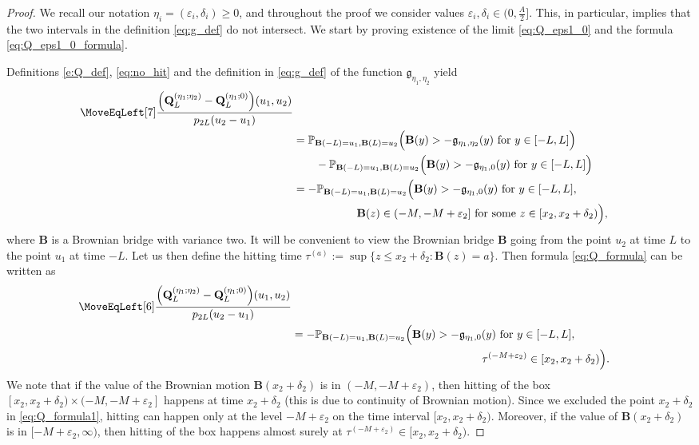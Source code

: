 \documentclass[oneside,final,11pt]{amsart}
\theoremstyle{definition}
\newcommand{\fg}{\mathfrak{g}}
\newcommand{\1}[1]{\mathbf{1}_{#1}}
\newcommand{\eps}{\varepsilon}
\newcommand{\fx}{x}
\newcommand{\fM}{M}
\newcommand{\fB}{\mathbf{B}}
\newcommand{\fQ}{\mathbf{Q}}
\renewcommand{\P}{\mathbb P}
\numberwithin{equation}{section}
\begin{document}
\begin{proof}
We recall our notation $\eta_i = (\eps_i, \delta_i) \geq 0$, and throughout the proof we consider values $\eps_i, \delta_i \in (0,\frac{A}{2}]$. This, in particular, implies that the two intervals in the definition \eqref{eq:g_def} do not intersect. We start by proving existence of the limit \eqref{eq:Q_eps1_0} and the formula \eqref{eq:Q_eps1_0_formula}.

Definitions \eqref{e:Q_def}, \eqref{eq:no_hit} and the definition in \eqref{eq:g_def} of the function $ \fg_{\eta_1, \eta_2}$ yield
\begin{equation}
\begin{split}
 \MoveEqLeft[7]
 \frac{\Bigl(\fQ_L^{(\eta_1; \eta_2)} - \fQ_L^{(\eta_1; 0)}\Bigr)(u_1, u_2)}{p_{2 L}(u_2 - u_1)}\\
 &=\P_{\fB(-L)=u_1, \fB(L)=u_2}\Bigl(\fB(y)>-\fg_{\eta_1, \eta_2}(y) \text{ for } y \in [-L,L]\Bigr) \\
 &\qquad- \P_{\fB(-L)=u_1, \fB(L)=u_2}\Bigl(\fB(y)>-\fg_{\eta_1, 0}(y) \text{ for } y \in [-L,L]\Bigr)\\
 &= - \P_{\fB(-L)=u_1, \fB(L)=u_2}\Bigl(\fB(y)>-\fg_{\eta_1, 0}(y) \text{ for } y \in [-L,L],\, \\
 & \hspace{2cm} \fB(z) \in (-\fM, -\fM + \eps_2] \text{ for some } z \in [\fx_2, \fx_2 + \delta_2)\Bigr),
 \end{split} \label{eq:Q_formula}
\end{equation}
where $\fB$ is a Brownian bridge with variance two. It will be convenient to view the Brownian bridge $\fB$ going from the point $u_2$ at time $L$ to the point $u_1$ at time $-L$. Let us then define the hitting time $\tau^{(a)} := \sup \{z \leq x_2 + \delta_2: \fB(z) = a\}$. Then formula \eqref{eq:Q_formula} can be written as
\begin{equation}
\begin{split}
\MoveEqLeft[6]
\frac{\Bigl(\fQ_L^{(\eta_1; \eta_2)} - \fQ_L^{(\eta_1; 0)}\Bigr)(u_1, u_2)}{p_{2 L}(u_2 - u_1)}\\
&= - \P_{\fB(-L)=u_1, \fB(L)=u_2}\Bigl(\fB(y)>-\fg_{\eta_1, 0}(y) \text{ for } y \in [-L,L],\, \\
& \hspace{6cm} \tau^{(-\fM + \eps_2)} \in [\fx_2, \fx_2 + \delta_2)\Bigr).
\end{split}\label{eq:Q_formula1}
\end{equation}
We note that if the value of the Brownian motion $ \fB(x_2 + \delta_2)$ is in $(-M, -M + \eps_2)$, then hitting of the box $[x_2, x_2 + \delta_2) \times (-M, -M + \eps_2]$ happens at time $x_2 + \delta_2$ (this is due to continuity of Brownian motion). Since we excluded the point $x_2 + \delta_2$ in \eqref{eq:Q_formula1}, hitting can happen only at the level $-M + \eps_2$ on the time interval $[x_2, x_2 + \delta_2)$. Moreover, if the value of $\fB(x_2 + \delta_2)$ is in $[-M + \eps_2, \infty)$, then hitting of the box happens almost surely at $\tau^{(-\fM + \eps_2)} \in [\fx_2, \fx_2 + \delta_2)$.


\end{proof}
\end{document}
